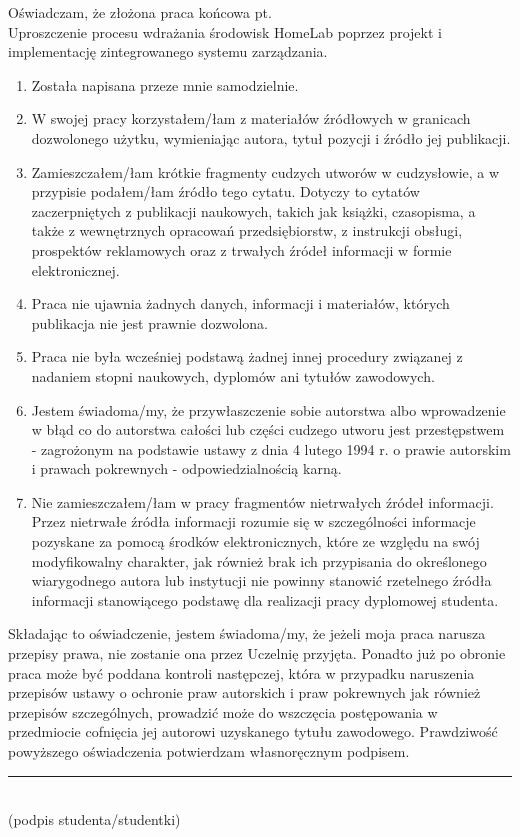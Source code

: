 {
\linespread{0.8}\selectfont

Oświadczam, że złożona praca końcowa pt. \\
Uproszczenie procesu wdrażania środowisk HomeLab poprzez projekt i implementację zintegrowanego systemu zarządzania.\\
\begin{enumerate}
    \item Została napisana przeze mnie samodzielnie.
    \item W swojej pracy korzystałem/łam z materiałów źródłowych w granicach dozwolonego użytku, wymieniając autora, tytuł pozycji i źródło jej publikacji.
    \item Zamieszczałem/łam krótkie fragmenty cudzych utworów w cudzysłowie, a w przypisie podałem/łam źródło tego cytatu. Dotyczy to cytatów zaczerpniętych z publikacji naukowych, takich jak książki, czasopisma, a także z wewnętrznych opracowań przedsiębiorstw, z instrukcji obsługi, prospektów reklamowych oraz z trwałych źródeł informacji w formie elektronicznej.
    \item Praca nie ujawnia żadnych danych, informacji i materiałów, których publikacja nie jest prawnie dozwolona.
    \item Praca nie była wcześniej podstawą żadnej innej procedury związanej z nadaniem stopni naukowych, dyplomów ani tytułów zawodowych.
    \item Jestem świadoma/my, że przywłaszczenie sobie autorstwa albo wprowadzenie w błąd co do autorstwa całości lub części cudzego utworu jest przestępstwem - zagrożonym na podstawie ustawy z dnia 4 lutego 1994 r. o prawie autorskim i prawach pokrewnych - odpowiedzialnością karną.
    \item Nie zamieszczałem/łam w pracy fragmentów nietrwałych źródeł informacji. Przez nietrwałe źródła informacji rozumie się w szczególności informacje pozyskane za pomocą środków elektronicznych, które ze względu na swój modyfikowalny charakter, jak również brak ich przypisania do określonego wiarygodnego autora lub instytucji nie powinny stanowić rzetelnego źródła informacji stanowiącego podstawę dla realizacji pracy dyplomowej studenta.
\end{enumerate}
Składając to oświadczenie, jestem świadoma/my, że jeżeli moja praca narusza przepisy prawa, nie zostanie ona przez Uczelnię przyjęta. Ponadto już po obronie praca może być poddana kontroli następczej, która w przypadku naruszenia przepisów ustawy o ochronie praw autorskich i praw pokrewnych jak również przepisów szczególnych, prowadzić może do wszczęcia postępowania w przedmiocie cofnięcia jej autorowi uzyskanego tytułu zawodowego.
Prawdziwość powyższego oświadczenia potwierdzam własnoręcznym podpisem.
\vspace{1cm}

\begin{flushright}
\rule{6cm}{0.4pt}\\
(podpis studenta/studentki)
\end{flushright}
}